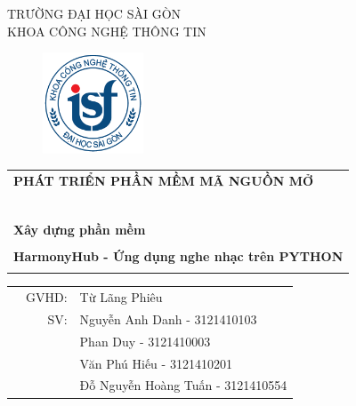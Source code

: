 \documentclass[a4paper]{article}
\begin{document}
\begin{titlepage}
	\begin{center}
		TRƯỜNG ĐẠI HỌC SÀI GÒN \\
		KHOA CÔNG NGHỆ THÔNG TIN
	\end{center}
	\vspace{1cm}

	\begin{figure}[h!]
		\begin{center}
			\includegraphics[width=3cm]{images/logoITSGU.png}
		\end{center}
	\end{figure}

	\vspace{1cm}


	\begin{center}
		\begin{tabular}{c}
			\multicolumn{1}{l}{\textbf{{\Large PHÁT TRIỂN PHẦN MỀM MÃ NGUỒN MỞ}}} \\
			~~                                                                    \\
			\hline
			\\
			\multicolumn{1}{l}{\textbf{{\Large Xây dựng phần mềm}}}               \\
			\\

			\textbf{{\Large HarmonyHub - Ứng dụng nghe nhạc trên PYTHON}}         \\
			\\
			\hline
		\end{tabular}
	\end{center}

	\vspace{3cm}

	\begin{table}[h]
		\begin{tabular}{rrl}
			\hspace{5 cm} & GVHD: & Từ Lãng Phiêu                     \\
			              & SV:   & Nguyễn Anh Danh - 3121410103      \\
			              &       & Phan Duy - 3121410003             \\
			              &       & Văn Phú Hiếu - 3121410201         \\
			              &       & Đỗ Nguyễn Hoàng Tuấn - 3121410554 \\
		\end{tabular}
		\vspace{1.5 cm}
	\end{table}


\end{titlepage}
\end{document}
